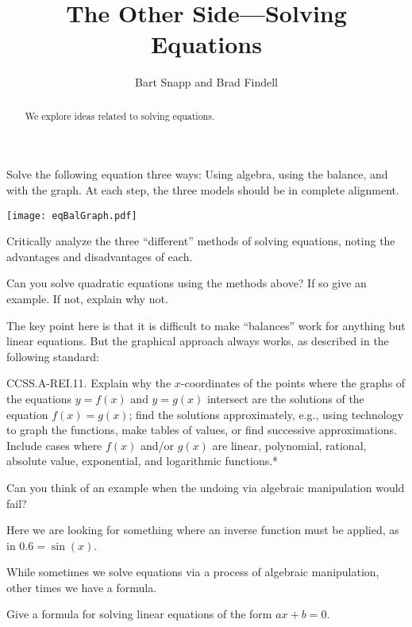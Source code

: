 \documentclass[nooutcomes]{ximera}
\title{The Other Side---Solving Equations}
\author{Bart Snapp and Brad Findell}
\begin{document}
\begin{abstract}
We explore ideas related to solving equations.
\end{abstract}
\maketitle

\label{A:otherSide}





\begin{problem}
Solve the following equation three ways: Using algebra, using the
balance, and with the graph. At each step, the three models should be in
complete alignment.
\begin{image}
\texttt{[image: eqBalGraph.pdf]}
\end{image}
\end{problem}


\begin{problem}
Critically analyze the three ``different'' methods of solving
equations, noting the advantages and disadvantages of each. 
\end{problem}

\begin{problem}
Can you solve quadratic equations using the methods above?
If so give an example. If not, explain why not.
\end{problem}

\begin{teachingnote}
The key point here is that it is difficult to make ``balances'' work for anything but linear equations.  But the graphical approach always works, as described in the following standard:  

CCSS.A-REI.11.  Explain why the $x$-coordinates of the points where the graphs of the equations $y = f(x)$ and $y = g(x)$ intersect are the solutions of the equation $f(x) = g(x)$; find the solutions approximately, e.g., using technology to graph the functions, make tables of values, or find successive approximations. Include cases where $f(x)$ and/or $g(x)$ are linear, polynomial, rational, absolute value, exponential, and logarithmic functions.*
\end{teachingnote}


\begin{problem}
Can you think of an example when the undoing via algebraic
manipulation would fail?
\end{problem}

\begin{teachingnote}
Here we are looking for something where an inverse function must be
applied, as in $0.6 = \sin(x)$.
\end{teachingnote}


While sometimes we solve equations via a process of algebraic
manipulation, other times we have a formula.


\begin{problem}
Give a formula for solving linear equations of the form $ax + b =0$.
\end{problem}
\end{document}
